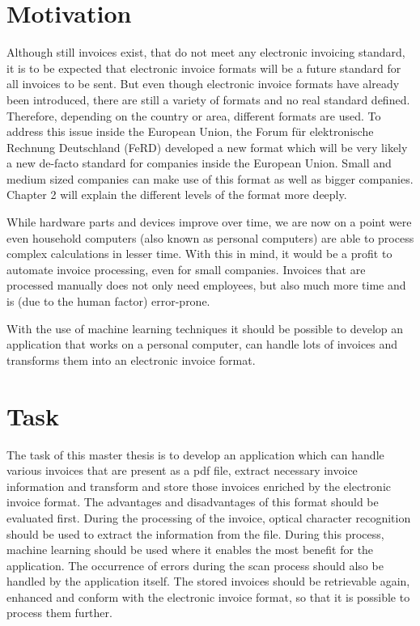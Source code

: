 \section{Motivation}
\label{sec1.2}

Although still invoices exist, that do not meet any electronic invoicing standard, it is to be expected that electronic invoice formats will be a future standard for all invoices to be sent. But even though electronic invoice formats have already been introduced, there are still a variety of formats and no real standard defined. Therefore, depending on the country or area, different formats are used. To address this issue inside the European Union, the Forum für elektronische Rechnung Deutschland (FeRD) developed a new format which will be very likely a new de-facto standard for companies inside the European Union. Small and medium sized companies can make use of this format as well as bigger companies. Chapter 2 will explain the different levels of the format more deeply.

While hardware parts and devices improve over time, we are now on a point were even household computers (also known as personal computers) are able to process complex calculations in lesser time. With this in mind, it would be a profit to automate invoice processing, even for small companies. Invoices that are processed manually does not only need employees, but also much more time and is (due to the human factor) error-prone. 

With the use of machine learning techniques it should be possible to develop an application that works on a personal computer, can handle lots of invoices and transforms them into an electronic invoice format.

\section{Task}
\label{sec1.3}

The task of this master thesis is to develop an application which can handle various invoices that are present as a pdf file, extract necessary invoice information and transform and store those invoices enriched by the electronic invoice format. The advantages and disadvantages of this format should be evaluated first.
During the processing of the invoice, optical character recognition should be used to extract the information from the file. During this process, machine learning should be used where it enables the most benefit for the application.
The occurrence of errors during the scan process should also be handled by the application itself.
The stored invoices should be retrievable again, enhanced and conform with the electronic invoice format, so that it is possible to process them further.

